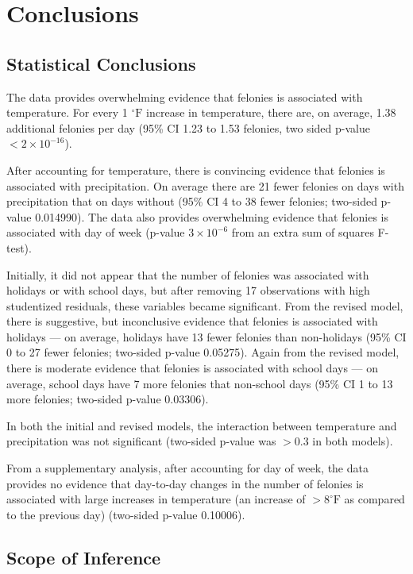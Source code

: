 \documentclass[11pt,notitlepage]{article}
\newcommand{\degf}{^\circ\text{F}}
\begin{document}
\section{Conclusions}
\label{sec:conclusions}

\subsection{Statistical Conclusions}

The data provides overwhelming evidence that felonies is associated with temperature. For every 1 $\degf$ increase in temperature, there are, on average, 1.38 additional felonies per day (95\% CI 1.23 to 1.53 felonies, two sided p-value $<2\times10^{-16}$).

After accounting for temperature, there is convincing evidence that felonies is associated with precipitation. On average there are 21 fewer felonies on days with precipitation that on days without (95\% CI 4 to 38 fewer felonies; two-sided p-value 0.014990). The data also provides overwhelming evidence that felonies is associated with day of week (p-value $3 \times 10^{-6}$ from an extra sum of squares F-test).

Initially, it did not appear that the number of felonies was associated with holidays or with school days, but after removing 17 observations with high studentized residuals, these variables became significant. From the revised model, there is suggestive, but inconclusive evidence that felonies is associated with holidays --- on average, holidays have 13 fewer felonies than non-holidays (95\% CI 0 to 27 fewer felonies; two-sided p-value 0.05275). Again from the revised model, there is moderate evidence that felonies is associated with school days --- on average, school days have 7 more felonies that non-school days (95\% CI 1 to 13 more felonies; two-sided p-value 0.03306).

In both the initial and revised models, the interaction between temperature and precipitation was not significant (two-sided p-value was $>0.3$ in both models).


From a supplementary analysis, after accounting for day of week, the data provides no evidence that day-to-day changes in the number of felonies is associated with large increases in temperature (an increase of $>8 \degf$ as compared to the previous day) (two-sided p-value 0.10006).


\subsection{Scope of Inference}
\end{document}
